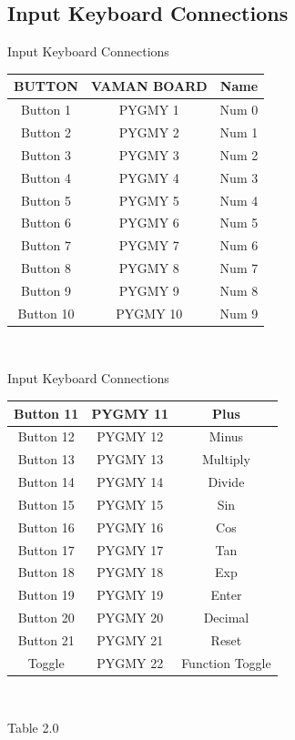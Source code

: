 \documentclass{beamer}
\theoremstyle{remark}
\begin{document}
\subsection{Input Keyboard Connections}
\begin{frame}{Input Keyboard Connections}
    \centering
\begin{tabular}{|c|c|c|}
\hline
BUTTON & VAMAN BOARD & Name\\
\hline
Button 1 & PYGMY 1 & Num 0\\
\hline
Button 2 & PYGMY 2 & Num 1\\
\hline
Button 3 & PYGMY 3 & Num 2\\
\hline
Button 4 & PYGMY 4 & Num 3\\
\hline
Button 5 & PYGMY 5 & Num 4\\
\hline
Button 6 & PYGMY 6 & Num 5\\
\hline
Button 7& PYGMY 7& Num 6\\
\hline
Button 8 & PYGMY 8 & Num 7\\
\hline
Button 9 & PYGMY 9 & Num 8\\
\hline
Button 10 & PYGMY 10 & Num 9\\
\hline
\end{tabular}\\
\end{frame}

\begin{frame}{Input Keyboard Connections}
    \centering
    \begin{tabular}{|c|c|c|}
        \hline
        Button 11 & PYGMY 11& Plus \\
        \hline
        Button 12 & PYGMY 12 & Minus\\
        \hline
        Button 13 & PYGMY 13 & Multiply\\
        \hline
        Button 14 & PYGMY 14 & Divide\\
        \hline
        Button 15 & PYGMY 15 & Sin\\
        \hline
        Button 16 & PYGMY 16 & Cos\\
        \hline
        Button 17 & PYGMY 17 & Tan\\
        \hline
        Button 18 & PYGMY 18 & Exp\\
        \hline
        Button 19 & PYGMY 19 & Enter\\
        \hline
        Button 20 & PYGMY 20 & Decimal\\
        \hline
        Button 21 & PYGMY 21 & Reset\\
        \hline
        Toggle & PYGMY 22 & Function Toggle\\
        \hline
    \end{tabular}
    \
    \centerline{Table 2.0}
\end{frame}
\end{document}
